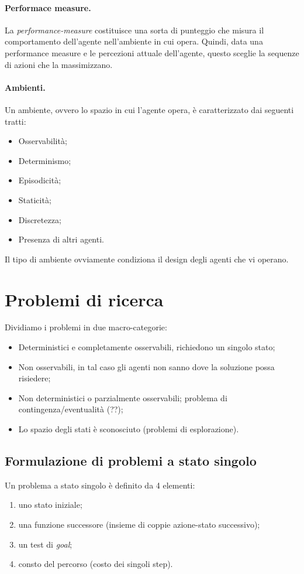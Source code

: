 \documentclass[a4paper, 11pt]{article}
\begin{document}
\paragraph{Performace measure.} La \textit{performance-measure} costituisce una sorta di punteggio che misura il comportamento dell'agente nell'ambiente in cui opera. Quindi, data una performance measure e le percezioni attuale dell'agente, questo sceglie la sequenze di azioni che la massimizzano.

\paragraph{Ambienti.} Un ambiente, ovvero lo spazio in cui l'agente opera, è caratterizzato dai seguenti tratti: \begin{itemize}
	\item Osservabilità;
	\item Determinismo;
	\item Episodicità;
	\item Staticità;
	\item Discretezza;
	\item Presenza di altri agenti.
\end{itemize}

Il tipo di ambiente ovviamente condiziona il design degli agenti che vi operano.

\newpage
\section{Problemi di ricerca}
Dividiamo i problemi in due macro-categorie:
\begin{itemize}
	\item Deterministici e completamente osservabili, richiedono un singolo stato;
	\item Non osservabili, in tal caso gli agenti non sanno dove la soluzione possa risiedere;
	\item Non deterministici o parzialmente osservabili; problema di contingenza/eventualità (??);
	\item Lo spazio degli stati è sconosciuto (problemi di esplorazione).
\end{itemize}

\subsection{Formulazione di problemi a stato singolo}
Un problema a stato singolo è definito da 4 elementi: \begin{enumerate}
	\item uno stato iniziale;
	\item una funzione successore (insieme di coppie azione-stato successivo);
	\item un test di \textit{goal};
	\item consto del percorso (costo dei singoli step).
\end{enumerate}
\end{document}
